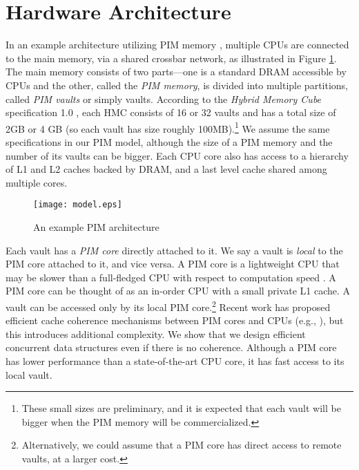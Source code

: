 \section{Hardware Architecture}


\label{section:hardware_model}

In an example architecture utilizing PIM memory \cite{Ahn2015:2, Zhang2014:TTP, Ahn2015:1}, 
multiple CPUs are connected to the main
memory, via a shared crossbar network, as illustrated in Figure \ref{figure:model}.
The main memory consists of two parts---one is a standard DRAM accessible by CPUs 
and the other, called the \textit{PIM memory}, is divided into multiple partitions, 
called \textit{PIM vaults} or simply vaults.  
According to the \textit{Hybrid Memory Cube} specification 1.0 \cite{website:HMC}, 
each HMC consists of 16 or 
32 vaults and has a total size of 2GB or 4 GB (so each vault has size roughly 100MB).\footnote{
These small sizes are preliminary, and it is expected that each vault will be bigger when the 
PIM memory will be commercialized.} 
We assume the same specifications in our PIM model, although the size of a PIM memory and 
the number of its vaults can be bigger. 
Each CPU core also has access to a hierarchy of L1 and L2 caches backed by DRAM,
and a last level cache shared among multiple cores. 

\begin{figure}[ht!]
\centering
\texttt{[image: model.eps]}
\caption{An example PIM architecture}
\label{figure:model}
\end{figure}

Each vault has a \textit{PIM core} directly attached to it.
We say a vault is \textit{local} to the PIM core attached to it, and vice versa.
A PIM core is a lightweight CPU that may be slower than a full-fledged CPU
with respect to computation speed \cite{Ahn2015:2}. 
A PIM core can be thought of as an in-order CPU with a small private L1 cache.
A vault can be accessed only by its local PIM core.\footnote{
Alternatively, we could assume that a PIM core has direct access to remote vaults, at a larger cost. }
Recent work has proposed efficient cache coherence mechanisms between PIM cores and CPUs  
(e.g., \cite{boroumand2016, Ahn2015:1}), but this introduces additional complexity. 
We show that we design efficient concurrent data structures even if there is no coherence.
Although a PIM core has lower performance than a state-of-the-art CPU core, 
it has fast access to its local vault.

